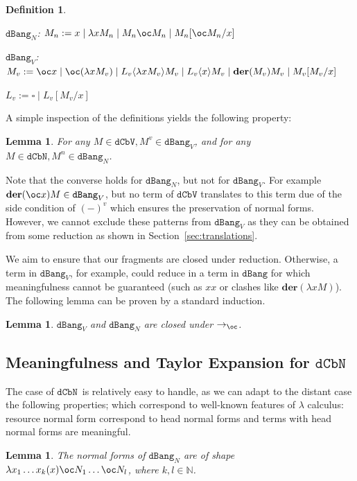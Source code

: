 \documentclass[10pt,a4paper]{article}
\newtheorem{lemma}[theorem]{Lemma}
\newtheorem{definition}[theorem]{Definition}
\newcommand{\<}{\langle}
\renewcommand{\>}{\rangle}
\newcommand{\der}[1]{\ensuremath{\mathbf{der}(#1)}}
\newcommand{\dcbn}{\ensuremath{\mathtt{dCbN}}}
\newcommand{\dcbv}{\ensuremath{\mathtt{dCbV}}}
\newcommand{\dbang}{\ensuremath{\mathtt{dBang}}}
\newcommand{\dbangv}{\ensuremath{\dbang_V}}
\newcommand{\dbangn}{\ensuremath{\dbang_N}}
\newcommand{\todbf}{\to_{\oc}} %
\newcommand{\es}[2]{[#1/#2]}
\newcommand{\tradv}[1]{\ensuremath{{#1}^v}}
\newcommand{\tradn}[1]{\ensuremath{{#1}^n}}
\begin{document}
\begin{definition}\

	\dbangn : $M_n := x \mid \lambda x M_n \mid M_n \oc  M_n \mid M_n\es{\oc
	M_n}x$
	
	\dbangv : 
		$M_v := \oc x \mid \oc(\lambda x M_v) 
		\mid L_v\<\lambda x M_v\> M_v \mid L_v\<x\> M_v \mid \der{M_v}M_v \mid M_v\es{M_v}x $

	$L_v:=\square\mid L_v[M_v/x]$

\end{definition}

A simple inspection of the definitions yields the following property:
\begin{lemma}\label{lem:trad_fragments}
	For any $M\in\dcbv, \tradv M\in\dbangv$, and for any $M\in\dcbn, \tradn M\in\dbangn$.
\end{lemma}

Note that the converse holds for $\dbangn$, but not for $\dbangv$. For example
$\der{\oc x}M\in\dbangv$, but no term of $\dcbv$ translates to
this term due of the side condition of $(-)^v$ which ensures the preservation of
normal forms. However, we cannot
exclude these patterns from $\dbangv$ as they can be obtained from some reduction
as shown in Section~\ref{sec:translations}.

We aim to ensure that our fragments are closed under reduction. Otherwise,
a term in $\dbangv$, for example, could reduce in a term in $\dbang$ for which
meaningfulness cannot be guaranteed (such as $xx$ or clashes like
$\der{\lambda xM}$). The following lemma can be proven by a standard induction.
\begin{lemma}
	$\dbangv$ and $\dbangn$ are closed under $\todbf$.
\end{lemma}

\subsection{Meaningfulness and Taylor Expansion for \dcbn}

The case of \dcbn\ is relatively easy to handle, as we can adapt to the distant
case the following properties; which correspond to well-known features of $\lambda$
calculus: resource normal form correspond to head normal forms and terms with head normal
forms are meaningful.

\begin{lemma}
	\label{lemma:dbangn-nf-shape}
	The normal forms of \dbangn{} are of shape $\lambda x_1\dots x_k (x) \oc N_1\dots \oc
	N_l$, where $k,l\in\mathbb N$.
\end{lemma}
\end{document}
